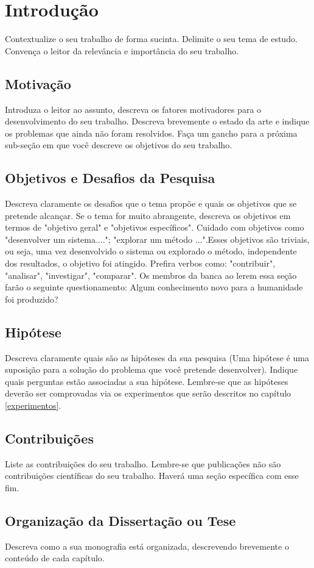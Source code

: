 \chapter[Introdução]{Introdução}

Contextualize o seu trabalho de forma sucinta. Delimite o seu tema de estudo. Convença o leitor da relevância e importância do seu trabalho.
 

\section{Motivação}
Introduza o leitor ao assunto, descreva os fatores motivadores para o desenvolvimento do seu trabalho.   Descreva brevemente o estado da arte e indique os problemas que ainda não foram resolvidos. Faça um gancho para a próxima sub-seção em que você descreve os  objetivos do seu trabalho. 

\section{Objetivos e Desafios da Pesquisa}
Descreva claramente os desafios que o tema propõe e quais os  objetivos que se pretende alcançar. Se o tema for muito abrangente, descreva os objetivos em termos de "objetivo geral" e  "objetivos específicos". Cuidado com objetivos como "desenvolver um sistema...."; "explorar um método ...".Esses objetivos são triviais, ou seja, uma vez desenvolvido o sistema ou explorado o método, independente dos resultados, o objetivo foi atingido. Prefira verbos como: "contribuir", "analisar", "investigar", "comparar". Os membros da banca ao lerem essa seção farão o seguinte questionamento: Algum conhecimento novo para a humanidade foi produzido?


\section{Hipótese}
Descreva claramente quais são as hipóteses da sua pesquisa (Uma hipótese é uma suposição para a solução do problema que você pretende desenvolver). Indique quais perguntas estão associadas a sua hipótese. Lembre-se que as hipóteses deverão ser comprovadas via os experimentos que serão descritos no capítulo \ref{experimentos}.

\section{Contribuições}
Liste as contribuições do seu trabalho. Lembre-se que publicações não são contribuições científicas do seu trabalho. Haverá uma seção específica com esse fim.

\section{Organização da Dissertação ou Tese}
Descreva como a sua monografia está organizada, descrevendo brevemente o conteúdo de cada capítulo.